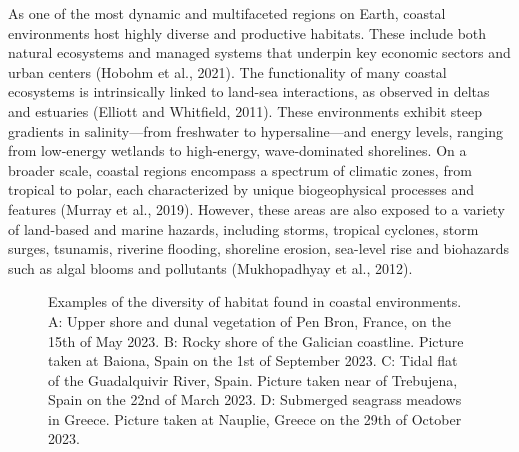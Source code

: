 \documentclass[
  letterpaper,
  11pt,
  english,
  singlespacing,
  headsepline]{MastersDoctoralThesis}
\begin{document}
\begin{spacing}{1.5}
As one of the most dynamic and multifaceted regions on Earth, coastal
environments host highly diverse and productive habitats. These include
both natural ecosystems and managed systems that underpin key economic
sectors and urban centers (Hobohm et al., 2021). The functionality of
many coastal ecosystems is intrinsically linked to land-sea
interactions, as observed in deltas and estuaries (Elliott and
Whitfield, 2011). These environments exhibit steep gradients in
salinity---from freshwater to hypersaline---and energy levels, ranging
from low-energy wetlands to high-energy, wave-dominated shorelines. On a
broader scale, coastal regions encompass a spectrum of climatic zones,
from tropical to polar, each characterized by unique biogeophysical
processes and features (Murray et al., 2019). However, these areas are
also exposed to a variety of land-based and marine hazards, including
storms, tropical cyclones, storm surges, tsunamis, riverine flooding,
shoreline erosion, sea-level rise and biohazards such as algal blooms
and pollutants (Mukhopadhyay et al., 2012).

\begin{figure}


\caption{\label{fig-CoastalHabitat}Examples of the diversity of habitat
found in coastal environments. A: Upper shore and dunal vegetation of
Pen Bron, France, on the 15th of May 2023. B: Rocky shore of the
Galician coastline. Picture taken at Baiona, Spain on the 1st of
September 2023. C: Tidal flat of the Guadalquivir River, Spain. Picture
taken near of Trebujena, Spain on the 22nd of March 2023. D: Submerged
seagrass meadows in Greece. Picture taken at Nauplie, Greece on the 29th
of October 2023.}


\end{figure}
\end{spacing}
\end{document}
